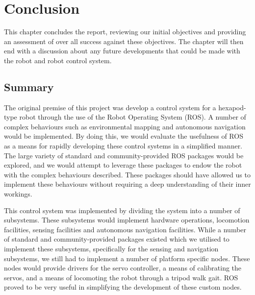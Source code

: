 \chapter{Conclusion}
\label{chap:conclusion}

This chapter concludes the report, reviewing our initial objectives and providing an assessment of over all success against these objectives. The chapter will then end with a discussion about any future developments that could be made with the robot and robot control system.


\section{Summary}

The original premise of this project was develop a control system for a hexapod-type robot through the use of the Robot Operating System (ROS). A number of complex behaviours such as environmental mapping and autonomous navigation would be implemented. By doing this, we would evaluate the usefulness of ROS as a means for rapidly developing these control systems in a simplified manner. The large variety of standard and community-provided ROS packages would be explored, and we would attempt to leverage these packages to endow the robot with the complex behaviours described. These packages should have allowed us to implement these behaviours without requiring a deep understanding of their inner workings.

This control system was implemented by dividing the system into a number of subsystems. These subsystems would implement hardware operations, locomotion facilities, sensing facilities and autonomous navigation facilities. While a number of standard and community-provided packages existed which we utilised to implement these subsystems, specifically for the sensing and navigation subsystems, we still had to implement a number of platform specific nodes. These nodes would provide drivers for the servo controller, a means of calibrating the servos, and a means of locomoting the robot through a tripod walk gait. ROS proved to be very useful in simplifying the development of these custom nodes.

